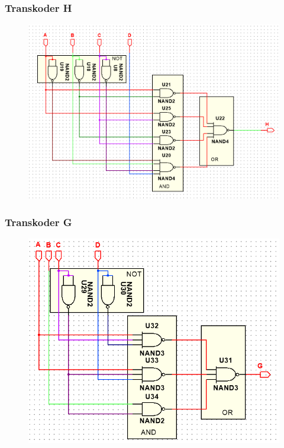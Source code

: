 \documentclass[a4paper]{article}
\begin{document}
\subsubsection{Transkoder H}
\begin{figure}[H]
 \centering
 \includegraphics[width=0.7\linewidth]{schemat_H.png}
\end{figure}

\subsubsection{Transkoder G}
\begin{figure}[H]
 \centering
 \includegraphics[width=0.7\linewidth]{schemat_G.png}
\end{figure}
\end{document}
